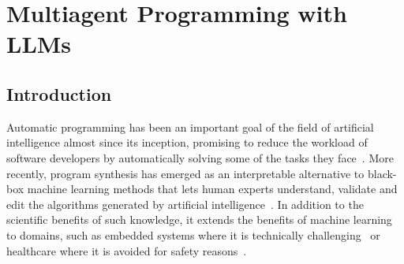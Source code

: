 \chapter{Multiagent Programming with LLMs}\label{ch:seidr}

\newcommand{\method}[0]{SEIDR}
\newcommand{\synthesize}[0]{SYNTHESIZE}
\newcommand{\execute}[0]{EXECUTE}
\newcommand{\instruct}[0]{INSTRUCT}
\newcommand{\instructs}[0]{INSTRUCT$^{\text{static}}$}
\newcommand{\instructllm}[0]{INSTRUCT$^{\text{LLM}}$}
\newcommand{\debug}[0]{DEBUG}
\newcommand{\rank}[0]{RANK}
\newcommand{\beamwidth}[0]{W}
\newcommand{\treearity}[0]{N}
\newcommand{\treearitydebug}[0]{N_\text{debug}}
\newcommand{\treearityexplain}[0]{N_\text{explain}}
\newcommand{\treearitydraft}[0]{N_\text{synth}}
\newcommand{\expectedoutput}[0]{O}
\newcommand{\synthmodel}[0]{$p_\text{synth}(\text{code}, \text{descr})$}
\newcommand{\debugmodel}[0]{$p_\text{debug}(\text{code}, \text{descr})$}
\newcommand{\textmodel}[0]{$p_\text{explain}(\text{code}, \text{descr})$}
\newcommand{\synthmodelnoargs}[0]{$p_\text{synth}$}
\newcommand{\debugmodelnoargs}[0]{$p_\text{debug}$}
\newcommand{\textmodelnoargs}[0]{$p_\text{explain}$}

\newcommand{\gpt}[0]{GPT-3.5}
\newcommand{\llama}[0]{Llama~3}
\newcommand{\cpp}[0]{C++}
\newcommand{\py}[0]{Python}
\newcommand{\smalltt}[1]{\texttt{\fontsize{8.5}{9}\selectfont#1}}


\section{Introduction}
\label{sec:seidr-intro}

Automatic programming has been an important goal of the field of artificial intelligence almost since its inception, promising to reduce the workload of software developers by automatically solving some of the tasks they face~\cite{manna1971:automatic}.
More recently, program synthesis has emerged as an interpretable alternative to black-box machine learning methods that lets human experts understand, validate and edit the algorithms generated by artificial intelligence~\cite{bastani2022:interpretable}.
In addition to the scientific benefits of such knowledge, it extends the benefits of machine learning to domains, such as embedded systems where it is technically challenging~\cite{dhar2021:survey} or healthcare where it is avoided for safety reasons~\cite{connolly2023:systematic,jia2022:role}.

